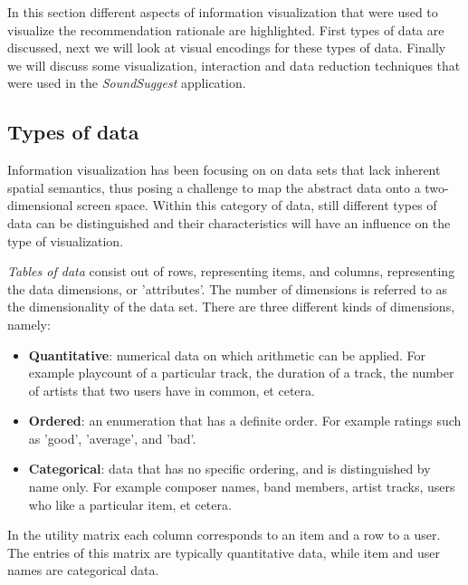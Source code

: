 In this section different aspects of information visualization that were used to visualize the recommendation rationale are highlighted. First types of data are discussed, next we will look at visual encodings for these types of data. Finally we will discuss some visualization, interaction and data reduction techniques that were used in the \emph{SoundSuggest} application.


\subsection{Types of data}\label{chapter:literature_study:section:interaction:subsection:datatypes}


Information visualization has been focusing on on data sets that lack inherent spatial semantics, thus posing a challenge to map the abstract data onto a two-dimensional screen space\cite{keim:2002}. Within this category of data, still different types of data can be distinguished and their characteristics will have an influence on the type of visualization.

\emph{Tables of data} consist out of rows, representing items, and columns, representing the data dimensions, or 'attributes'. The number of dimensions is referred to as the dimensionality of the data set\cite{keim:2002}. There are three different kinds of dimensions, namely\cite{shirley:2009}:

\begin{itemize}
	\item \textbf{Quantitative}: numerical data on which arithmetic can be applied. For example playcount of a particular track, the duration of a track, the number of artists that two users have in common, et cetera.
	\item \textbf{Ordered}: an enumeration that has a definite order. For example ratings such as 'good', 'average', and 'bad'.
	\item \textbf{Categorical}: data that has no specific ordering, and is distinguished by name only. For example composer names, band members, artist tracks, users who like a particular item, et cetera.
\end{itemize}

In the utility matrix each column corresponds to an item and a row to a user. The entries of this matrix are typically quantitative data, while item and user names are categorical data.

